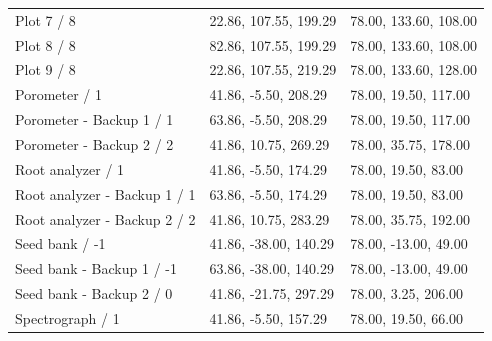 \begin{longtable}{p{}p{}p{}}
Plot 7 /\allowbreak{} 8 & 22.\allowbreak{}86, 107.\allowbreak{}55, 199.\allowbreak{}29 & 78.\allowbreak{}00, 133.\allowbreak{}60, 108.\allowbreak{}00 \\
Plot 8 /\allowbreak{} 8 & 82.\allowbreak{}86, 107.\allowbreak{}55, 199.\allowbreak{}29 & 78.\allowbreak{}00, 133.\allowbreak{}60, 108.\allowbreak{}00 \\
Plot 9 /\allowbreak{} 8 & 22.\allowbreak{}86, 107.\allowbreak{}55, 219.\allowbreak{}29 & 78.\allowbreak{}00, 133.\allowbreak{}60, 128.\allowbreak{}00 \\
Porometer /\allowbreak{} 1 & 41.\allowbreak{}86, -5.\allowbreak{}50, 208.\allowbreak{}29 & 78.\allowbreak{}00, 19.\allowbreak{}50, 117.\allowbreak{}00 \\
Porometer - Backup 1 /\allowbreak{} 1 & 63.\allowbreak{}86, -5.\allowbreak{}50, 208.\allowbreak{}29 & 78.\allowbreak{}00, 19.\allowbreak{}50, 117.\allowbreak{}00 \\
Porometer - Backup 2 /\allowbreak{} 2 & 41.\allowbreak{}86, 10.\allowbreak{}75, 269.\allowbreak{}29 & 78.\allowbreak{}00, 35.\allowbreak{}75, 178.\allowbreak{}00 \\
Root analyzer /\allowbreak{} 1 & 41.\allowbreak{}86, -5.\allowbreak{}50, 174.\allowbreak{}29 & 78.\allowbreak{}00, 19.\allowbreak{}50, 83.\allowbreak{}00 \\
Root analyzer - Backup 1 /\allowbreak{} 1 & 63.\allowbreak{}86, -5.\allowbreak{}50, 174.\allowbreak{}29 & 78.\allowbreak{}00, 19.\allowbreak{}50, 83.\allowbreak{}00 \\
Root analyzer - Backup 2 /\allowbreak{} 2 & 41.\allowbreak{}86, 10.\allowbreak{}75, 283.\allowbreak{}29 & 78.\allowbreak{}00, 35.\allowbreak{}75, 192.\allowbreak{}00 \\
Seed bank /\allowbreak{} -1 & 41.\allowbreak{}86, -38.\allowbreak{}00, 140.\allowbreak{}29 & 78.\allowbreak{}00, -13.\allowbreak{}00, 49.\allowbreak{}00 \\
Seed bank - Backup 1 /\allowbreak{} -1 & 63.\allowbreak{}86, -38.\allowbreak{}00, 140.\allowbreak{}29 & 78.\allowbreak{}00, -13.\allowbreak{}00, 49.\allowbreak{}00 \\
Seed bank - Backup 2 /\allowbreak{} 0 & 41.\allowbreak{}86, -21.\allowbreak{}75, 297.\allowbreak{}29 & 78.\allowbreak{}00, 3.\allowbreak{}25, 206.\allowbreak{}00 \\
Spectrograph /\allowbreak{} 1 & 41.\allowbreak{}86, -5.\allowbreak{}50, 157.\allowbreak{}29 & 78.\allowbreak{}00, 19.\allowbreak{}50, 66.\allowbreak{}00 \\

\end{longtable}
